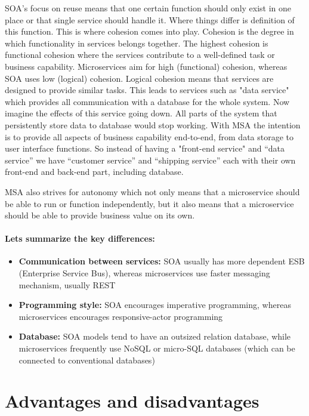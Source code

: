 \documentclass[12pt,oneside]{fithesis2}
\begin{document}
SOA's focus on reuse means that one certain function should only exist in one place or that single service should handle it. Where things differ is definition of this function. This is where cohesion comes into play. Cohesion is the degree in which functionality in services belongs together. The highest cohesion is functional cohesion where the services contribute to a well-defined task or business capability. Microservices aim for high (functional) cohesion, whereas SOA uses low (logical) cohesion. Logical cohesion means that services are designed to provide similar tasks. This leads to services such as "data service"  which provides all communication with a database for the whole system. Now imagine the effects of this service going down. All parts of the system that persistently store data to database would stop working. With MSA the intention is to provide all aspects of business capability end-to-end, from data storage to user interface functions. So instead of having a "front-end service" and “data service” we have “customer service” and “shipping service” each with their own front-end and back-end part, including database.

MSA also strives for autonomy which not only means that a microservice should be able to run or function independently, but it also means that a microservice should be able to provide business value on its own.

\paragraph{Lets summarize the key differences:}

\begin{itemize}
\item \textbf{Communication between services:} SOA usually has more dependent ESB (Enterprise Service Bus), whereas microservices use faster messaging mechanism, usually REST
\item \textbf{Programming style:} SOA encourages imperative programming, whereas microservices encourages responsive-actor programming
\item \textbf{Database:} SOA models tend to have an outsized relation database, while microservices frequently use NoSQL or micro-SQL databases (which can be connected to conventional databases)
\end{itemize}


\section{Advantages and disadvantages}
\end{document}
